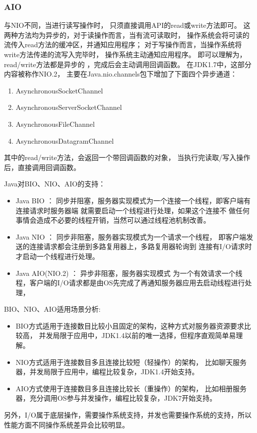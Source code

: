 \subsubsection{AIO}
与NIO不同，当进行读写操作时，
只须直接调用API的read或write方法即可。
这两种方法均为异步的，对于读操作而言，当有流可读取时，
操作系统会将可读的流传入read方法的缓冲区，并通知应用程序；
对于写操作而言，当操作系统将write方法传递的流写入完毕时，
操作系统主动通知应用程序。 
 即可以理解为，read/write方法都是异步的
 ，完成后会主动调用回调函数。  在JDK1.7中，这部分内容被称作NIO.2，
 主要在Java.nio.channels包下增加了下面四个异步通道：
\begin{enumerate}
	\item AsynchronousSocketChannel
 \item  AsynchronousServerSocketChannel
\item AsynchronousFileChannel
\item AsynchronousDatagramChannel
\end{enumerate}
其中的read/write方法，会返回一个带回调函数的对象，
当执行完读取/写入操作后，直接调用回调函数。

Java对BIO、NIO、AIO的支持：
\begin{itemize}
	\item Java BIO ： 同步并阻塞，服务器实现模式为一个连接一个线程，即客户端有连接请求时服务器端
	就需要启动一个线程进行处理，如果这个连接不
	做任何事情会造成不必要的线程开销，当然可以通过线程池机制改善。
\item Java NIO ： 同步非阻塞，服务器实现模式为一个请求一个线程，
即客户端发送的连接请求都会注册到多路复用器上，多路复用器轮询到
连接有I/O请求时才启动一个线程进行处理。
\item Java AIO(NIO.2) ： 异步非阻塞，服务器实现模式
为一个有效请求一个线程，客户端的I/O请求都是由OS先完成了再通知服务器应用去启动线程进行处理，
\end{itemize}
BIO、NIO、AIO适用场景分析:
\begin{itemize}
	\item BIO方式适用于连接数目比较小且固定的架构，这种方式对服务器资源要求比较高，
	并发局限于应用中，JDK1.4以前的唯一选择，但程序直观简单易理解。
\item NIO方式适用于连接数目多且连接比较短（轻操作）的架构，
比如聊天服务器，并发局限于应用中，编程比较复杂，JDK1.4开始支持。
\item AIO方式使用于连接数目多且连接比较长（重操作）的架构，
比如相册服务器，充分调用OS参与并发操作，编程比较复杂，JDK7开始支持。
\end{itemize}
另外，I/O属于底层操作，需要操作系统支持，并发也需要操作系统的支持，所以性能方面不同操作系统差异会比较明显。

